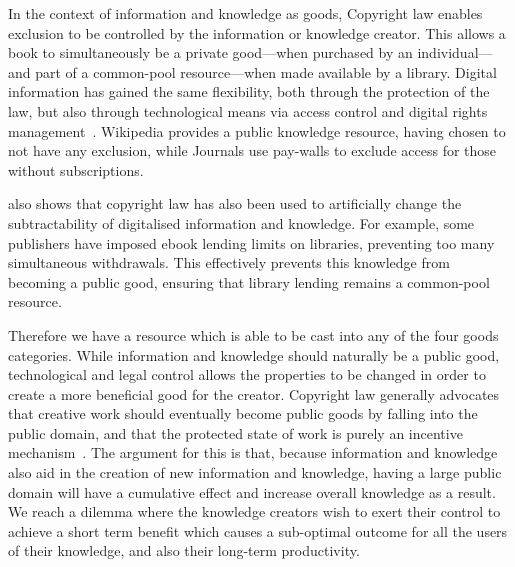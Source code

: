 In the context of information and knowledge as goods, Copyright law enables exclusion to be controlled by the information or knowledge creator. 
This allows a book to simultaneously be a private good---when purchased by an individual---and part of a common-pool resource---when made available by a library. 
Digital information has gained the same flexibility, both through the protection of the law, but also through technological means via access control and digital rights management~\citep{Lessig2004}. 
Wikipedia provides a public knowledge resource, having chosen to not have any exclusion, while Journals use pay-walls to exclude access for those without subscriptions.

\citet{Lessig2004} also shows that copyright law has also been used to artificially change the subtractability of digitalised information and knowledge. 
For example, some publishers have imposed ebook lending limits on libraries, preventing too many simultaneous withdrawals. 
This effectively prevents this knowledge from becoming a public good, ensuring that library lending remains a common-pool resource.

Therefore we have a resource which is able to be cast into any of the four goods categories. 
While information and knowledge should naturally be a public good, technological and legal control allows the properties to be changed in order to create a more beneficial good for the creator. 
Copyright law generally advocates that creative work should eventually become public goods by falling into the public domain, and that the protected state of work is purely an incentive mechanism~\citep{Samuelson2006}. 
The argument for this is that, because information and knowledge also aid in the creation of new information and knowledge, having a large public domain will have a cumulative effect and increase overall knowledge as a result. 
We reach a dilemma where the knowledge creators wish to exert their control to achieve a short term benefit which causes a sub-optimal outcome for all the users of their knowledge, and also their long-term productivity.


